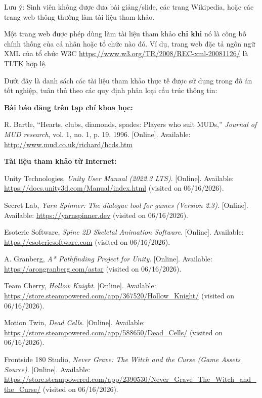 \documentclass[../DoAn.tex]{subfiles}
\begin{document}
Lưu ý: Sinh viên không được đưa bài giảng/slide, các trang Wikipedia, hoặc các trang web thông thường làm tài liệu tham khảo. 

Một trang web được phép dùng làm tài liệu tham khảo \textbf{chỉ khi} nó là công bố chính thống của cá nhân hoặc tổ chức nào đó. Ví dụ, trang web đặc tả ngôn ngữ XML của tổ chức W3C \url{https://www.w3.org/TR/2008/REC-xml-20081126/} là TLTK hợp lệ.

Dưới đây là danh sách các tài liệu tham khảo thực tế được sử dụng trong đồ án tốt nghiệp, tuân thủ theo các quy định phân loại cấu trúc thông tin:

\textbf{Bài báo đăng trên tạp chí khoa học:}

\cite{bartle1996hearts} R. Bartle, ``Hearts, clubs, diamonds, spades: Players who suit MUDs,'' \textit{Journal of MUD research}, vol. 1, no. 1, p. 19, 1996. [Online]. Available: \url{http://www.mud.co.uk/richard/hcds.htm}

\textbf{Tài liệu tham khảo từ Internet:}

\cite{unitymanual} Unity Technologies, \textit{Unity User Manual (2022.3 LTS)}. [Online]. Available: \url{https://docs.unity3d.com/Manual/index.html} (visited on 06/16/2026).

\cite{yarnspinner} Secret Lab, \textit{Yarn Spinner: The dialogue tool for games (Version 2.3)}. [Online]. Available: \url{https://yarnspinner.dev} (visited on 06/16/2026).

\cite{esotericspine} Esoteric Software, \textit{Spine 2D Skeletal Animation Software}. [Online]. Available: \url{https://esotericsoftware.com} (visited on 06/16/2026).

\cite{arongranbergastar} A. Granberg, \textit{A* Pathfinding Project for Unity}. [Online]. Available: \url{https://arongranberg.com/astar} (visited on 06/16/2026).

\cite{hollowknightgame} Team Cherry, \textit{Hollow Knight}. [Online]. Available: \url{https://store.steampowered.com/app/367520/Hollow_Knight/} (visited on 06/16/2026).

\cite{deadcellsgame} Motion Twin, \textit{Dead Cells}. [Online]. Available: \url{https://store.steampowered.com/app/588650/Dead_Cells/} (visited on 06/16/2026).

\cite{nevergravegame} Frontside 180 Studio, \textit{Never Grave: The Witch and the Curse (Game Assets Source)}. [Online]. Available: \url{https://store.steampowered.com/app/2390530/Never_Grave_The_Witch_and_the_Curse/} (visited on 06/16/2026).
\end{document}
